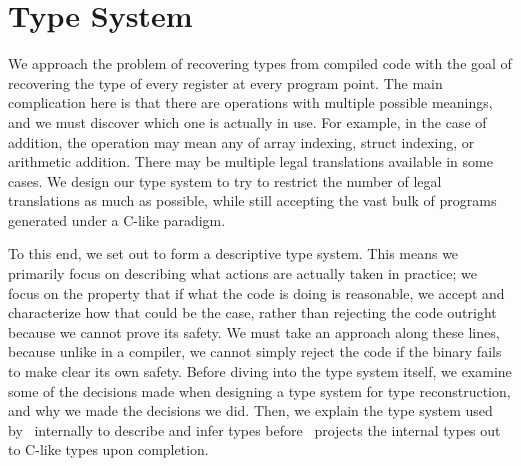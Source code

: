 \section{Type System}
\label{sec:typesys}
We approach the problem of recovering types from compiled code with the goal of recovering the type of every register at every program point. The main complication here is that there are operations with multiple possible meanings, and we must discover which one is actually in use. For example, in the case of addition, the operation may mean any of array indexing, struct indexing, or arithmetic addition. There may be multiple legal translations available in some cases. We design our type system to try to restrict the number of legal translations as much as possible, while still accepting the vast bulk of programs generated under a C-like paradigm.

To this end, we set out to form a descriptive type system. This means we primarily focus on describing what actions are actually taken in practice; we focus on the property that if what the code is doing is reasonable, we accept and characterize how that could be the case, rather than rejecting the code outright because we cannot prove its safety. We must take an approach along these lines, because unlike in a compiler, we cannot simply reject the code if the binary fails to make clear its own safety. Before diving into the type system itself, we examine some of the decisions made when designing a type system for type reconstruction, and why we made the decisions we did. Then, we explain the type system used by \bitr\ internally to describe and infer types before \bitr\ projects the internal types out to C-like types upon completion.

